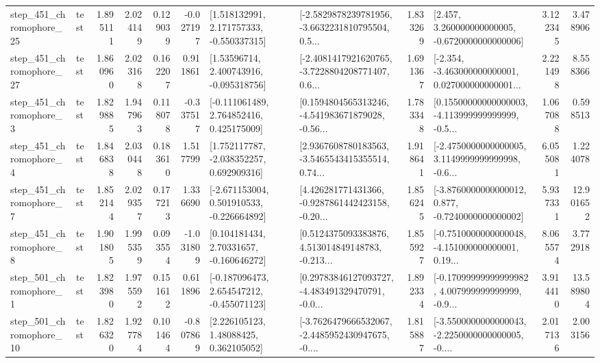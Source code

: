\begin{tabular}{llrrrrllrlrr}
  step\_451\_chromophore\_25 &      test &      1.895111 &    2.024149 &      0.129039 & -0.027197 &    [1.518132991, 2.171757333, -0.550337315] &  [-2.5829878239781956, -3.6632231810795504, 0.5... &       1.833269 &    [2.457, 3.260000000000005, -0.6720000000000006] &            3.122345 &          3.478906 \\
  step\_451\_chromophore\_27 &      test &      1.860960 &    2.023168 &      0.162207 &  0.911861 &     [1.53596714, 2.400743916, -0.095318756] &  [-2.4081417921620765, -3.7228804208771407, 0.6... &       1.691367 &  [-2.354, -3.463000000000001, 0.027000000000001... &            2.221498 &          8.558366 \\
   step\_451\_chromophore\_3 &      test &      1.829885 &    1.947963 &      0.118078 & -0.337517 &    [-0.111061489, 2.764852416, 0.425175009] &  [0.1594804565313246, -4.541983671879028, -0.56... &       1.783348 &  [0.15500000000000003, -4.113999999999999, -0.5... &            1.067088 &          0.598513 \\
   step\_451\_chromophore\_4 &      test &      1.846838 &    2.030448 &      0.183610 &  1.517799 &    [1.752117787, -2.038352257, 0.692909316] &  [2.9367608780183563, -3.5465543415355514, 0.74... &       1.918641 &  [-2.4750000000000005, 3.1149999999999998, -0.6... &            6.055081 &          1.224078 \\
   step\_451\_chromophore\_7 &      test &      1.852144 &    2.029357 &      0.177213 &  1.336690 &   [-2.671153004, 0.501910533, -0.226664892] &  [4.426281771431366, -0.9287861442423158, -0.20... &       1.856245 &  [-3.8760000000000012, 0.877, -0.7240000000000002] &            5.937331 &         12.901652 \\
   step\_451\_chromophore\_8 &      test &      1.901805 &    1.995359 &      0.093554 & -1.031809 &     [0.104181434, 2.70331657, -0.160646272] &  [0.5124375093383876, 4.513014849148783, -0.213... &       1.855927 &  [-0.7510000000000048, -4.151000000000001, 0.19... &            8.065574 &          3.772918 \\
   step\_501\_chromophore\_1 &      test &      1.823980 &    1.975592 &      0.151612 &  0.611896 &   [-0.187096473, 2.654547212, -0.455071123] &  [0.29783846127093727, -4.483491329470791, -0.0... &       1.892334 &  [-0.17099999999999982, 4.007999999999999, -0.9... &            3.914410 &         13.589804 \\
  step\_501\_chromophore\_10 &      test &      1.826320 &    1.927784 &      0.101464 & -0.807869 &      [2.226105123, 1.48088425, 0.362105052] &  [-3.7626479666532067, -2.4485952430947675, -0.... &       1.815887 &  [-3.5500000000000043, -2.2250000000000005, -0.... &            2.017136 &          2.003156 \\

\end{tabular}
